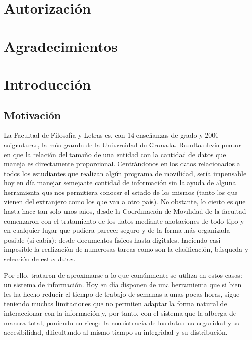 \documentclass[12pt]{article}
\begin{document}


\section*{Autorización}

\section*{Agradecimientos}

\newpage

\tableofcontents

\newpage

\listoffigures
\listoftables

\newpage


\section{Introducción}
\subsection{Motivación}

La Facultad de Filosofía y Letras es, con 14 enseñanzas de grado y 2000 asignaturas, la más grande de la Universidad de Granada. Resulta obvio pensar en que la relación del tamaño de una entidad con la cantidad de datos que maneja es directamente proporcional. Centrándonos en los datos relacionados a todos los estudiantes que realizan algún programa de movilidad, sería impensable hoy en día manejar semejante cantidad de información sin la ayuda de alguna herramienta que nos permitiera conocer el estado de los mismos (tanto los que vienen del extranjero como los que van a otro país). No obstante, lo cierto es que hasta hace tan solo unos años, desde la Coordinación de Movilidad de la facultad comenzaron con el tratamiento de los datos mediante anotaciones de todo tipo y en cualquier lugar que pudiera parecer seguro y de la forma más organizada posible (si cabía): desde documentos físicos hasta digitales, haciendo casi imposible la realización de numerosas tareas como son la clasificación, búsqueda y selección de estos datos.

Por ello, trataron de aproximarse a lo que comúnmente se utiliza en estos casos: un sistema de información. Hoy en día disponen de una herramienta que si bien les ha hecho reducir el tiempo de trabajo de semanas a unas pocas horas, sigue teniendo muchas limitaciones que no permiten adaptar la forma natural de interaccionar con la información y, por tanto, con el sistema que la alberga de manera total, poniendo en riesgo la consistencia de los datos, su seguridad y su accesibilidad, dificultando al mismo tiempo su integridad y su distribución.
\end{document}
